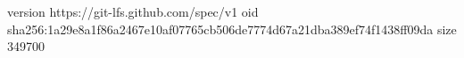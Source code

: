version https://git-lfs.github.com/spec/v1
oid sha256:1a29e8a1f86a2467e10af07765cb506de7774d67a21dba389ef74f1438ff09da
size 349700
